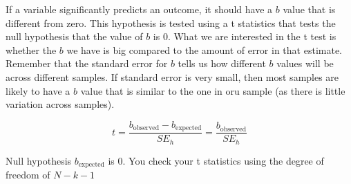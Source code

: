 If a variable significantly predicts an outcome, it should have a $b$ value that is different from zero. This hypothesis is tested using a t statistics that tests the null hypothesis that the value of $b$ is 0. What we are interested in the t test is whether the $b$ we have is big compared to the amount of error in that estimate. Remember that the standard error for $b$ tells us how different $b$ values will be across different samples. If standard error is very small, then most samples are likely to have a $b$ value that is similar to the one in oru sample (as there is little variation across samples). 

\begin{equation}
t = \frac{b_{\text{observed}} - b_{\text{expected}}}{SE_h} = \frac{b_{\text{observed}}}{SE_h} 
\end{equation}

Null hypothesis $b_{\text{expected}}$ is 0. You check your t statistics using the degree of freedom of $N-k-1$